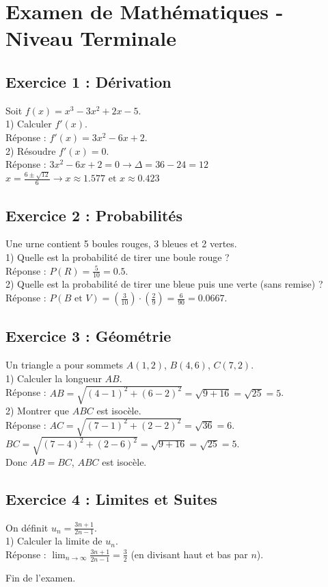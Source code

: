 \documentclass{article}
\begin{document}
\section*{Examen de Mathématiques - Niveau Terminale}

\subsection*{Exercice 1 : Dérivation}
Soit $f(x) = x^3 - 3x^2 + 2x - 5$.\\
1) Calculer $f'(x)$.\\
Réponse : $f'(x) = 3x^2 - 6x + 2$.\\
2) Résoudre $f'(x) = 0$.\\
Réponse : $3x^2 - 6x + 2 = 0 \rightarrow \Delta = 36 - 24 = 12$\\
   $x = \frac{6 \pm \sqrt{12}}{6} \rightarrow x \approx 1.577 \text{ et } x \approx 0.423$

\subsection*{Exercice 2 : Probabilités}
Une urne contient 5 boules rouges, 3 bleues et 2 vertes.\\
1) Quelle est la probabilité de tirer une boule rouge ?\\
Réponse : $P(R) = \frac{5}{10} = 0.5$.\\
2) Quelle est la probabilité de tirer une bleue puis une verte (sans remise) ?\\
Réponse : $P(B \text{ et } V) = \left(\frac{3}{10}\right) \cdot \left(\frac{2}{9}\right) = \frac{6}{90} = 0.0667$.

\subsection*{Exercice 3 : Géométrie}
Un triangle a pour sommets $A(1,2)$, $B(4,6)$, $C(7,2)$.\\
1) Calculer la longueur $AB$.\\
Réponse : $AB = \sqrt{(4-1)^2 + (6-2)^2} = \sqrt{9 + 16} = \sqrt{25} = 5$.\\
2) Montrer que $ABC$ est isocèle.\\
Réponse : $AC = \sqrt{(7-1)^2 + (2-2)^2} = \sqrt{36} = 6$.\\
   $BC = \sqrt{(7-4)^2 + (2-6)^2} = \sqrt{9 + 16} = \sqrt{25} = 5$.\\
   Donc $AB = BC$, $ABC$ est isocèle.

\subsection*{Exercice 4 : Limites et Suites}
On définit $u_n = \frac{3n + 1}{2n - 1}$.\\
1) Calculer la limite de $u_n$.\\
Réponse : $\lim_{n \to \infty} \frac{3n + 1}{2n - 1} = \frac{3}{2}$ (en divisant haut et bas par $n$).

Fin de l'examen.
\end{document}

